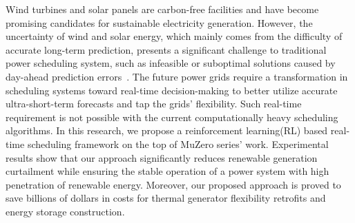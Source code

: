 Wind turbines and solar panels are carbon-free facilities and have become promising candidates for sustainable electricity generation. 
However, the uncertainty of wind and solar energy, which mainly comes from the difficulty of accurate long-term prediction, presents a significant challenge to traditional power scheduling system, such as infeasible or suboptimal solutions caused by day-ahead prediction errors~\cite{jabr2014robust}. The future power grids require a transformation in scheduling systems toward real-time decision-making to better utilize accurate ultra-short-term forecasts and tap the grids' flexibility. Such real-time requirement is not possible with the current computationally heavy scheduling algorithms.
In this research, we propose a reinforcement learning(RL) based real-time scheduling framework on the top of MuZero series' work.
Experimental results show that our approach significantly reduces renewable generation curtailment while ensuring the stable operation of a power system with high penetration of renewable energy. Moreover, our proposed approach is proved to save billions of dollars in costs for thermal generator flexibility retrofits and energy storage construction.

  
